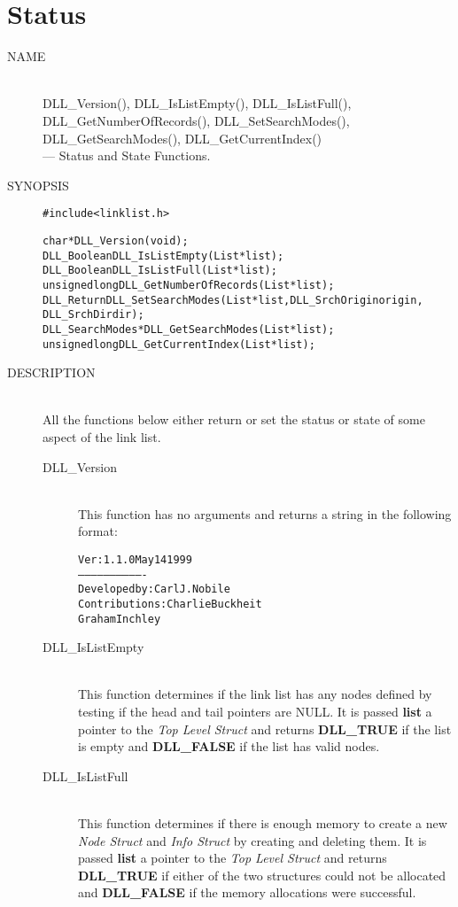 \documentclass[10pt,letterpaper]{report}
\begin{document}
\section*{Status}
\begin{description}
\item[NAME]\quad\\
DLL\_Version(), DLL\_IsListEmpty(), DLL\_IsListFull(),\\
DLL\_GetNumberOfRecords(), DLL\_SetSearchModes(),\\
DLL\_GetSearchModes(), DLL\_GetCurrentIndex()\\
 --- Status and State Functions.
\item[SYNOPSIS]
\begin{alltt}

#include <linklist.h>

char *DLL_Version(void);
DLL_Boolean DLL_IsListEmpty(List *list);
DLL_Boolean DLL_IsListFull(List *list);
unsigned long DLL_GetNumberOfRecords(List *list);
DLL_Return DLL_SetSearchModes(List *list, DLL_SrchOrigin origin,
                              DLL_SrchDir dir);
DLL_SearchModes *DLL_GetSearchModes(List *list);
unsigned long DLL_GetCurrentIndex(List *list);
\end{alltt}
\item[DESCRIPTION]\quad\\
All the functions below either return or set the status or state of some aspect of the link list.

 \begin{description}
 \item[DLL\_Version]\quad\\
 This function has no arguments and returns a string in the following format:
 \begin{alltt}
Ver: 1.1.0  May 14 1999
-------------------------------
 Developed by: Carl J. Nobile
Contributions: Charlie Buckheit
               Graham Inchley
 \end{alltt}
 \vspace{-16pt}
 \item[DLL\_IsListEmpty]\quad\\
 This function determines if the link list has any nodes defined by testing if the head and tail pointers are NULL.  It is passed \textbf{list} a pointer to the \emph{Top Level Struct} and returns \textbf{DLL\_TRUE} if the list is empty and \textbf{DLL\_FALSE} if the list has valid nodes.

 \item[DLL\_IsListFull]\quad\\
 This function determines if there is enough memory to create a new \emph{Node Struct} and \emph{Info Struct} by creating and deleting them.  It is passed \textbf{list} a pointer to the \emph{Top Level Struct} and returns \textbf{DLL\_TRUE} if either of the two structures could not be allocated and \textbf{DLL\_FALSE} if the memory allocations were successful.


\end{description}
\end{description}
\end{document}
